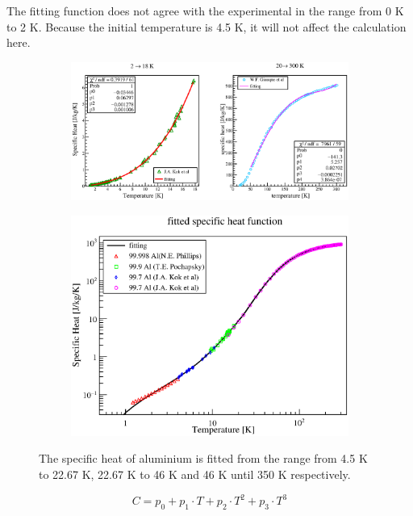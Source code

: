 The fitting function does not agree with the experimental in the range from 0 K to 2 K.
Because the initial temperature is 4.5 K, it will not affect the calculation here.
  \begin{figure}[H]
   \begin{subfigure}{0.3\textwidth}
    \centering
	\includegraphics[scale=0.43]{chapter5/fig/alspheat.eps}
   \end{subfigure}
   \hspace{0.2\textwidth}
   \begin{subfigure}{0.3\textwidth}
    \centering
	\includegraphics[scale=0.43]{chapter5/fig/alspheat2.eps}
   \end{subfigure}
   \caption{The specific heat of aluminium is fitted from the range from 4.5 K to 22.67 K, 22.67 K to 46 K and 46 K until 350 K respectively.}
   \label{4alsh2}
  \end{figure}
\begin{equation}
 C = p_0 + p_1 \cdot T + p_2 \cdot T^2 + p_3 \cdot T^3
\end{equation}
